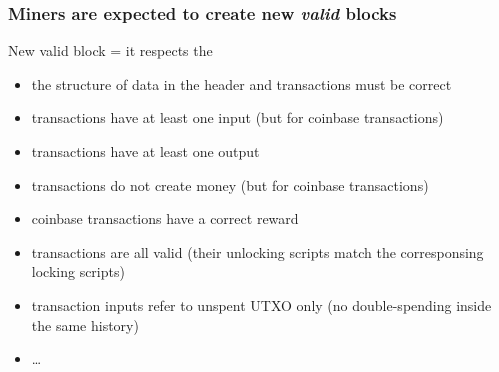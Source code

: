 \documentclass[11pt]{beamer}  %
\begin{document}
\begin{frame}\frametitle{Miners are expected to create new \emph{valid} blocks}

  \begin{greenbox}{New valid block = it respects the {\color{pink}{consensus rules}}}
    \begin{itemize}
    \item the structure of data in the header and transactions must be correct
    \item transactions have at least one input (but for coinbase transactions)
    \item transactions have at least one output
    \item transactions do not create money (but for coinbase transactions)
    \item coinbase transactions have a correct reward
    \item transactions are all valid (their unlocking scripts match the corresponsing locking scripts)
    \item transaction inputs refer to unspent UTXO only
      (\alert{no double-spending inside the same history})
    \item \ldots
    \end{itemize}
  \end{greenbox}
  
\end{frame}
\end{document}
